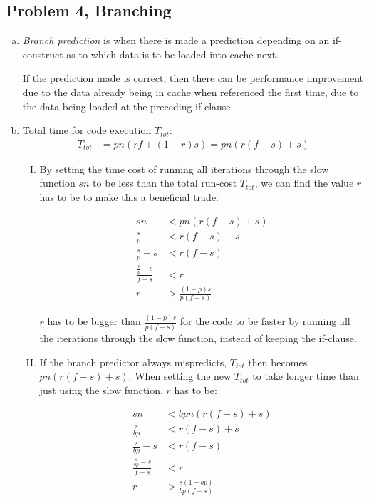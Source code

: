 \documentclass[fontsize=11pt, paper=a4, titlepage]{article}
\begin{document}
\subsection{Problem 4, Branching}
\begin{enumerate}[a)]

    \item \textit{Branch prediction} is when there is made a prediction
depending on an if-construct as to which data is to be loaded into cache next.

If the prediction made is correct, then there can be performance improvement due
to the data already being in cache when referenced the first time, due to the
data being loaded at the preceding if-clause.

    \item Total time for code execution $T_{tot}$:
    \begin{align*}
        T_{tot} &= pn(rf + (1-r)s) = pn(r(f-s) + s)
    \end{align*}

    \begin{enumerate}[I)]

        \item By setting the time cost of running all iterations through the
slow function $sn$ to be less than the total run-cost $T_{tot}$, we can find the value $r$ has to be to make this a beneficial trade:

        \begin{align*}
            sn &< pn(r(f-s) + s) \\
            \frac{s}{p} &< r(f-s) + s \\
            \frac{s}{p} - s &< r(f-s) \\
            \frac{\frac{s}{p} - s}{f-s} &< r \\
            r &> \frac{(1-p)s}{p(f-s)}
        \end{align*}

    $r$ has to be bigger than $\frac{(1-p)s}{p(f-s)}$ for the code to be faster
by running all the iterations through the slow function, instead of keeping the
if-clause.

    \item If the branch predictor always mispredicts, $T_{tot}$ then becomes
$pn(r(f-s) + s)$. When setting the new $T_{tot}$ to take longer time than just using the slow function, $r$ has to be:

        \begin{align*}
            sn &< bpn(r(f-s) + s) \\
            \frac{s}{bp} &< r(f-s) + s \\
            \frac{s}{bp} - s &< r(f-s) \\
            \frac{\frac{s}{bp} - s}{f-s} &< r \\
            r &> \frac{s(1-bp)}{bp(f-s)}
        \end{align*}

    \end{enumerate}
\end{enumerate}
\end{document}
